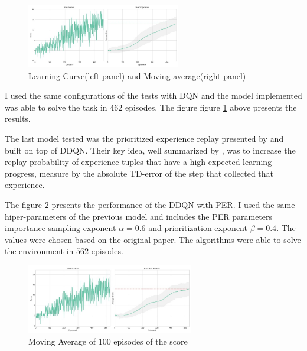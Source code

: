 \documentclass[a4paper]{article}
\begin{document}
\begin{figure}[ht]
\centering
\includegraphics[width=0.60\textwidth]{../notebooks/figures/2018-08-24-ddqn-learning-curve.jpg}
\caption{Learning Curve(left panel) and Moving-average(right panel)}
\label{fig:ddqn}
\end{figure}

I used the same configurations of the tests with DQN and the model implemented was able to solve the task in $462$ episodes. The figure figure \ref{fig:ddqn} above presents the results.

The last model tested was the prioritized experience replay presented by \cite{SchaulQAS15} and built on top of DDQN. Their key idea, well summarized by \cite{Wang:2015wz}, was to increase the replay probability of experience tuples that have a high expected learning progress, measure by the absolute TD-error of the step that collected that experience. 

The figure \ref{fig:ddqnper} presents the performance of the DDQN with PER. I used the same hiper-parameters of the previous model and includes the PER parameters importance sampling exponent $\alpha=0.6$ and prioritization exponent $\beta=0.4$. The values were chosen based on the original paper. The algorithms were able to solve the environment in $562$ episodes.


\begin{figure}[ht]
\centering
\includegraphics[width=0.65\textwidth]{../notebooks/figures/2018-08-23-ddqnpre-learning-curve.jpg}
\caption{Moving Average of $100$ episodes of the score}
\label{fig:ddqnper}
\end{figure}
\end{document}
